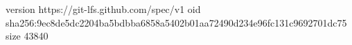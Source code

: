 version https://git-lfs.github.com/spec/v1
oid sha256:9ec8de5dc2204ba5bdbba6858a5402b01aa72490d234e96fc131c9692701dc75
size 43840
